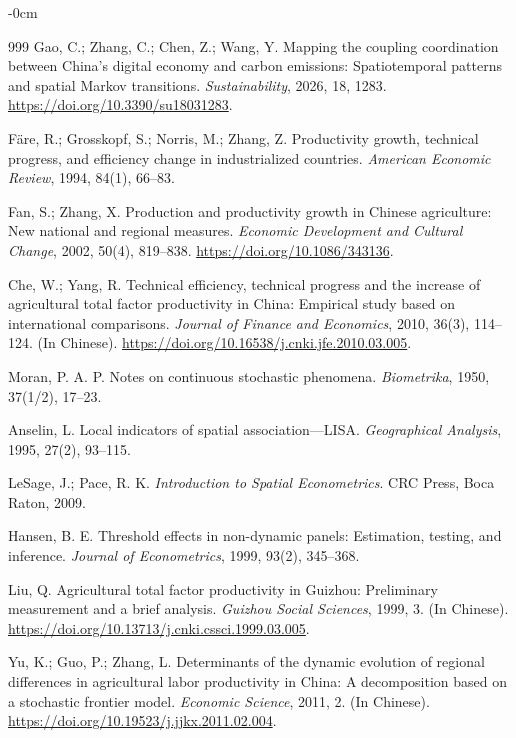 \documentclass[sustainability,article,submit,moreauthors]{Definitions/mdpi}
\numberwithin{equation}{section}
\begin{document}
\begin{adjustwidth}{-\extralength}{0cm}
\begin{thebibliography}{999}
 Gao, C.; Zhang, C.; Chen, Z.; Wang, Y. Mapping the coupling coordination between China's digital economy and carbon emissions: Spatiotemporal patterns and spatial Markov transitions. \textit{Sustainability}, 2026, 18, 1283. \url{https://doi.org/10.3390/su18031283}.

 F\"are, R.; Grosskopf, S.; Norris, M.; Zhang, Z. Productivity growth, technical progress, and efficiency change in industrialized countries. \textit{American Economic Review}, 1994, 84(1), 66--83.

 Fan, S.; Zhang, X. Production and productivity growth in Chinese agriculture: New national and regional measures. \textit{Economic Development and Cultural Change}, 2002, 50(4), 819--838. \url{https://doi.org/10.1086/343136}.

 Che, W.; Yang, R. Technical efficiency, technical progress and the increase of agricultural total factor productivity in China: Empirical study based on international comparisons. \textit{Journal of Finance and Economics}, 2010, 36(3), 114--124. (In Chinese). \url{https://doi.org/10.16538/j.cnki.jfe.2010.03.005}.

 Moran, P. A. P. Notes on continuous stochastic phenomena. \textit{Biometrika}, 1950, 37(1/2), 17--23.

 Anselin, L. Local indicators of spatial association---LISA. \textit{Geographical Analysis}, 1995, 27(2), 93--115.

 LeSage, J.; Pace, R. K. \textit{Introduction to Spatial Econometrics}. CRC Press, Boca Raton, 2009.

 Hansen, B. E. Threshold effects in non-dynamic panels: Estimation, testing, and inference. \textit{Journal of Econometrics}, 1999, 93(2), 345--368.

 Liu, Q. Agricultural total factor productivity in Guizhou: Preliminary measurement and a brief analysis. \textit{Guizhou Social Sciences}, 1999, 3. (In Chinese). \url{https://doi.org/10.13713/j.cnki.cssci.1999.03.005}.

 Yu, K.; Guo, P.; Zhang, L. Determinants of the dynamic evolution of regional differences in agricultural labor productivity in China: A decomposition based on a stochastic frontier model. \textit{Economic Science}, 2011, 2. (In Chinese). \url{https://doi.org/10.19523/j.jjkx.2011.02.004}.


\end{thebibliography}
\end{adjustwidth}
\end{document}
